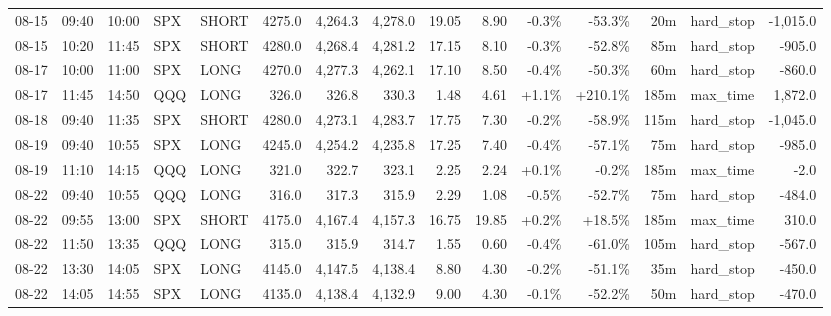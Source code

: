 \documentclass[11pt,a4paper,twoside]{article}
\begin{document}
\begin{landscape}
\begin{center}
\begin{longtable}{>{\color{txtmain}}l l l l l r r r r r r r r >{\color{txtmain}}l r}
08-15 & 09:40 & 10:00 & SPX & SHORT & 4275.0 & 4,264.3 & 4,278.0 & 19.05 & 8.90 & \textcolor{lossred}{-0.3\%} & \textcolor{lossred}{-53.3\%} & 20m & hard\_stop & \textcolor{lossred}{-1,015.0} \\
08-15 & 10:20 & 11:45 & SPX & SHORT & 4280.0 & 4,268.4 & 4,281.2 & 17.15 & 8.10 & \textcolor{lossred}{-0.3\%} & \textcolor{lossred}{-52.8\%} & 85m & hard\_stop & \textcolor{lossred}{-905.0} \\
08-17 & 10:00 & 11:00 & SPX & LONG & 4270.0 & 4,277.3 & 4,262.1 & 17.10 & 8.50 & \textcolor{lossred}{-0.4\%} & \textcolor{lossred}{-50.3\%} & 60m & hard\_stop & \textcolor{lossred}{-860.0} \\
08-17 & 11:45 & 14:50 & QQQ & LONG & 326.0 & 326.8 & 330.3 & 1.48 & 4.61 & \textcolor{wingreen}{+1.1\%} & \textcolor{wingreen}{+210.1\%} & 185m & max\_time & \textcolor{wingreen}{1,872.0} \\
08-18 & 09:40 & 11:35 & SPX & SHORT & 4280.0 & 4,273.1 & 4,283.7 & 17.75 & 7.30 & \textcolor{lossred}{-0.2\%} & \textcolor{lossred}{-58.9\%} & 115m & hard\_stop & \textcolor{lossred}{-1,045.0} \\
08-19 & 09:40 & 10:55 & SPX & LONG & 4245.0 & 4,254.2 & 4,235.8 & 17.25 & 7.40 & \textcolor{lossred}{-0.4\%} & \textcolor{lossred}{-57.1\%} & 75m & hard\_stop & \textcolor{lossred}{-985.0} \\
08-19 & 11:10 & 14:15 & QQQ & LONG & 321.0 & 322.7 & 323.1 & 2.25 & 2.24 & \textcolor{wingreen}{+0.1\%} & \textcolor{lossred}{-0.2\%} & 185m & max\_time & \textcolor{lossred}{-2.0} \\
08-22 & 09:40 & 10:55 & QQQ & LONG & 316.0 & 317.3 & 315.9 & 2.29 & 1.08 & \textcolor{lossred}{-0.5\%} & \textcolor{lossred}{-52.7\%} & 75m & hard\_stop & \textcolor{lossred}{-484.0} \\
08-22 & 09:55 & 13:00 & SPX & SHORT & 4175.0 & 4,167.4 & 4,157.3 & 16.75 & 19.85 & \textcolor{wingreen}{+0.2\%} & \textcolor{wingreen}{+18.5\%} & 185m & max\_time & \textcolor{wingreen}{310.0} \\
08-22 & 11:50 & 13:35 & QQQ & LONG & 315.0 & 315.9 & 314.7 & 1.55 & 0.60 & \textcolor{lossred}{-0.4\%} & \textcolor{lossred}{-61.0\%} & 105m & hard\_stop & \textcolor{lossred}{-567.0} \\
08-22 & 13:30 & 14:05 & SPX & LONG & 4145.0 & 4,147.5 & 4,138.4 & 8.80 & 4.30 & \textcolor{lossred}{-0.2\%} & \textcolor{lossred}{-51.1\%} & 35m & hard\_stop & \textcolor{lossred}{-450.0} \\
08-22 & 14:05 & 14:55 & SPX & LONG & 4135.0 & 4,138.4 & 4,132.9 & 9.00 & 4.30 & \textcolor{lossred}{-0.1\%} & \textcolor{lossred}{-52.2\%} & 50m & hard\_stop & \textcolor{lossred}{-470.0} \\

\end{longtable}
\end{center}
\end{landscape}
\end{document}
